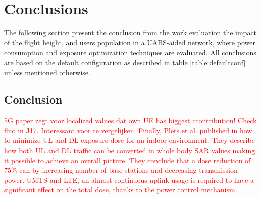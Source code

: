 \chapter{Conclusions}
\label{chap:conclusions}

The following section present the conclusion from the work evaluation the impact of the flight height, and users population in a UABS-aided network, where  power consumption and exposure optimization techniques are evaluated.  
All conclusions are based on the default configuration as described in table \ref{table:defaultconf} unless mentioned otherwise.

\section{Conclusion}
\textcolor{red}{5G paper zegt voor localized values dat own UE has biggest ccontribution! Check fluo in J17. Interessant voor te vergelijken.}
\textcolor{red}{Finally, Plets et al. published in \cite{J22_plets2015joint} how 
to minimize \gls{UL} and \gls{DL} exposure dose for an indoor environment. They describe how both \gls{UL} and \gls{DL} traffic 
can be converted in whole body SAR values making it possible to achieve an overall picture.
They conclude that a dose reduction of 75\% can by increasing number of base stations and decreasing transmission power.
UMTS and LTE, an almost continuous
uplink usage is required to have a significant effect on the total dose, thanks to the power control mechanism.}

